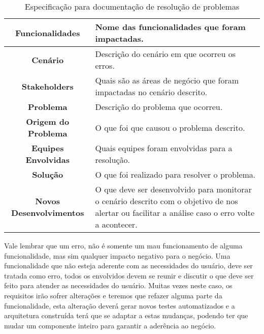       \begin{table}[h!]
        \centering
        \begin{tabular}{|c|p{10cm}|}
          \hline
          \textbf{Funcionalidades} &
          Nome das funcionalidades que foram impactadas. \\ \hline
          \textbf{Cenário} &
          Descrição do cenário em que ocorreu os erros. \\ \hline
          \textbf{Stakeholders} &
          Quais são as áreas de negócio que foram impactadas no cenário descrito. \\ \hline
          \textbf{Problema} &
          Descrição do problema que ocorreu. \\ \hline
          \textbf{Origem do Problema} &
          O que foi que causou o problema descrito. \\ \hline
          \textbf{Equipes Envolvidas} &
          Quais equipes foram envolvidas para a resolução. \\ \hline
          \textbf{Solução} &
          O que foi realizado para resolver o problema. \\ \hline
          \textbf{Novos Desenvolvimentos} &
          O que deve ser desenvolvido para monitorar o cenário descrito com o
          objetivo de nos alertar ou facilitar a análise caso o erro volte a
          acontecer. \\ \hline
        \end{tabular}
        \caption{Especificação para documentação de resolução de problemas}
        \label{Tabela:12}
      \end{table}

      Vale lembrar que um erro, não é somente um mau funcionamento de alguma
      funcionalidade, mas sim qualquer impacto negativo para o negócio. Uma
      funcionalidade que não esteja aderente com as necessidades do usuário, deve
      ser tratada como erro, todos os envolvidos devem se reunir e discutir o que
      deve ser feito para atender as necessidades do usuário. Muitas vezes neste
      caso, os requisitos irão sofrer alterações e teremos que refazer alguma parte
      da funcionalidade, esta alteração deverá gerar novos testes automatizados
      e a arquitetura construída terá que se adaptar a estas mudanças, podendo ter
      que mudar um componente inteiro para garantir a aderência ao negócio.

